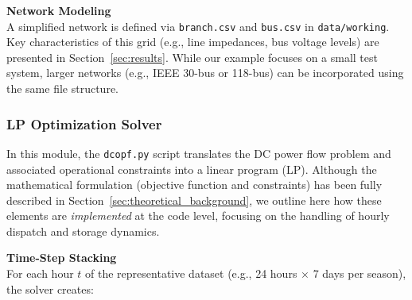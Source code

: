 \textbf{Network Modeling} \\
A simplified network is defined via \texttt{branch.csv} and \texttt{bus.csv} in \texttt{data/working}. 
Key characteristics of this grid (e.g., line impedances, bus voltage levels) are presented in 
Section~\ref{sec:results}. While our example focuses on a small test system, larger networks 
(e.g., IEEE 30-bus or 118-bus) can be incorporated using the same file structure.


\subsubsection{LP Optimization Solver}
\label{sec:lp_solver}
In this module, the \texttt{dcopf.py} script translates the DC power flow problem and associated operational 
constraints into a linear program (LP). Although the mathematical formulation (objective function and constraints)
has been fully described in Section~\ref{sec:theoretical_background}, we outline here how these elements are 
\emph{implemented} at the code level, focusing on the handling of hourly dispatch and storage dynamics.

\textbf{Time-Step Stacking}\\
For each hour $t$ of the representative dataset (e.g., 24 hours $\times$ 7 days per season), the solver creates:

